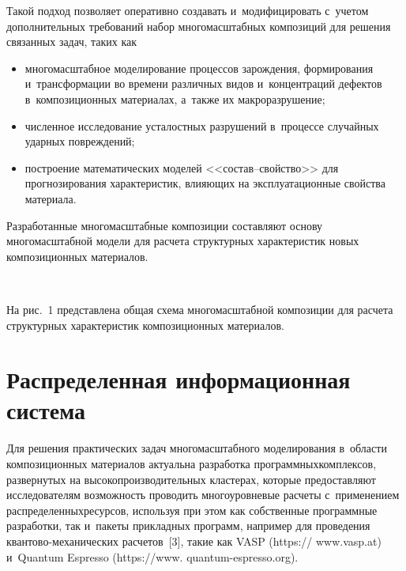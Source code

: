 \begin{multicols}{2}
     Такой подход позволяет оперативно создавать и~модифицировать с~учетом 
дополнительных требований набор многомасштабных композиций для решения 
связанных задач, таких как
     \begin{itemize}
\item многомасштабное моделирование процессов зарождения, формирования 
и~трансформации во времени различных видов и~концентраций дефектов 
в~композиционных материалах, а~также их макроразрушение;
\item численное исследование усталостных разрушений в~процессе случайных 
ударных повреждений;
\item построение математических моделей <<со\-став--свой\-ст\-во>> для 
прогнозирования характеристик, влияющих на эксплуатационные свойства 
материала.
\end{itemize}

     Разработанные многомасштабные композиции со\-став\-ля\-ют основу 
многомасштабной модели для расчета структурных характеристик новых 
композиционных материалов.
     
     
     \begin{figure*}[b] %
  \begin{center}  
    \mbox{%
\epsfxsize=162.103mm
}

\end{center}
\vspace*{-9pt}
\end{figure*}

     На рис.~1 пред\-став\-ле\-на общая схема многомасштабной композиции для 
расчета структурных характеристик композиционных материалов.





     
     

    \section{Распределенная информационная система}
    
    
    
   Для решения практических задач многомасштабного моделирования в~об\-ласти 
композиционных материалов актуальна разработка программных\linebreak комплексов, 
развернутых на {высокопроизводительных} кластерах, которые предоставляют 
исследователям возможность проводить многоуровневые расчеты с~применением 
распределенных\linebreak ресурсов, используя при этом как собственные программные 
разработки, так и~пакеты прикладных программ, например для проведения 
кван\-то\-во-ме\-ха\-ни\-че\-ских расчетов~[3], такие как VASP ({\sf https:// www.vasp.at}) 
и~Quantum Espresso ({\sf https://www. quantum-espresso.org}). 
   

\end{multicols}
